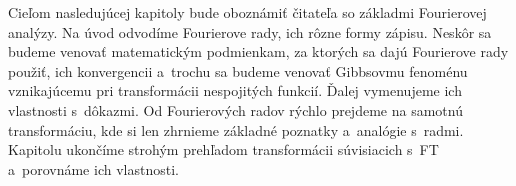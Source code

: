 Cieľom nasledujúcej kapitoly bude oboznámiť čitateľa so základmi
Fourierovej analýzy. Na úvod odvodíme Fourierove rady, ich rôzne formy
zápisu. Neskôr sa budeme venovať matematickým podmienkam, za ktorých
sa dajú Fourierove rady použiť, ich konvergencii a~trochu sa
budeme venovať Gibbsovmu fenoménu vznikajúcemu pri transformácii
nespojitých funkcií. Ďalej vymenujeme ich vlastnosti s~dôkazmi.
Od Fourierových radov rýchlo prejdeme na samotnú transformáciu,
kde si len zhrnieme základné poznatky a~analógie s~radmi. Kapitolu
ukončíme strohým prehľadom transformácii súvisiacich s~FT a~porovnáme
ich vlastnosti.
